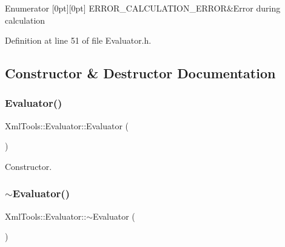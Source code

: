 \begin{DoxyEnumFields}{Enumerator}
[0pt][0pt]{}\hypertarget{class_xml_tools_1_1_evaluator_a83556834c4fd68f4836782936cc29a6ba3414a1f123c2ee682d4700245c9b37e3}{}\label{class_xml_tools_1_1_evaluator_a83556834c4fd68f4836782936cc29a6ba3414a1f123c2ee682d4700245c9b37e3} 
E\+R\+R\+O\+R\+\_\+\+C\+A\+L\+C\+U\+L\+A\+T\+I\+O\+N\+\_\+\+E\+R\+R\+OR&Error during calculation \\
\hline

\end{DoxyEnumFields}


Definition at line 51 of file Evaluator.\+h.



\subsection{Constructor \& Destructor Documentation}
\hypertarget{class_xml_tools_1_1_evaluator_adcce935da40868c8e9ee41a6cd7da30c}{}\label{class_xml_tools_1_1_evaluator_adcce935da40868c8e9ee41a6cd7da30c} 
\subsubsection{\texorpdfstring{Evaluator()}{Evaluator()}\hspace{0.1cm}{\footnotesize\ttfamily [1/2]}}
{\footnotesize\ttfamily Xml\+Tools\+::\+Evaluator\+::\+Evaluator (\begin{DoxyParamCaption}{ }\end{DoxyParamCaption})}

Constructor. \hypertarget{class_xml_tools_1_1_evaluator_acf06d5359f233c9e5c5d9127eb065f25}{}\label{class_xml_tools_1_1_evaluator_acf06d5359f233c9e5c5d9127eb065f25} 
\subsubsection{\texorpdfstring{$\sim$\+Evaluator()}{~Evaluator()}}
{\footnotesize\ttfamily Xml\+Tools\+::\+Evaluator\+::$\sim$\+Evaluator (\begin{DoxyParamCaption}{ }\end{DoxyParamCaption})}

